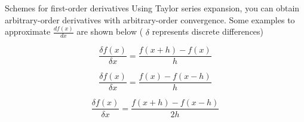 \documentclass[presentation]{beamer}
\begin{document}
\begin{frame}[label={sec:orgeb17e07}]{Schemes for first-order derivatives}
Using Taylor series expansion, you can obtain arbitrary-order derivatives
with arbitrary-order convergence. Some examples to approximate \(\frac{df(x)}{dx}\) are shown below ( \(\delta\) represents discrete
differences)
\begin{example}
\[ \frac{\delta f(x)}{\delta x} = \frac{f(x+h) - f(x)}{h}\]
\end{example}
\begin{example}
\[ \frac{\delta f(x)}{\delta x} = \frac{f(x) - f(x-h)}{h}\]
\end{example}
\begin{example}
\[ \frac{\delta f(x)}{\delta x} = \frac{f(x+h) - f(x-h)}{2h}\]
\end{example}
\end{frame}
\end{document}
